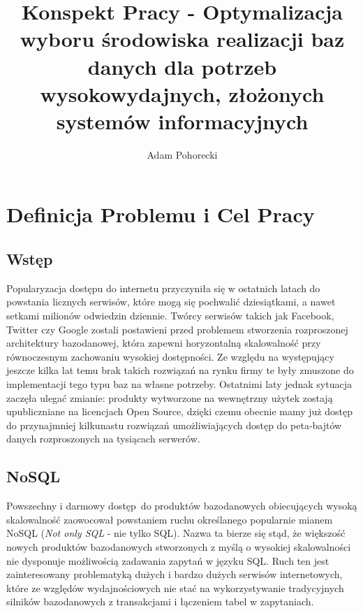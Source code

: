 \documentclass[a4paper,11pt]{article}
\title{Konspekt Pracy - Optymalizacja
wyboru środowiska realizacji baz danych dla potrzeb wysokowydajnych,
złożonych systemów informacyjnych}
\author{Adam Pohorecki}
\begin{document}


\maketitle

\section{Definicja Problemu i Cel Pracy}

\subsection*{Wstęp}

Popularyzacja dostępu do internetu przyczyniła się w ostatnich latach do 
powstania licznych serwisów, które mogą się pochwalić dziesiątkami, a nawet
setkami milionów odwiedzin dziennie. Twórcy serwisów takich jak Facebook,
Twitter czy Google zostali postawieni przed problemem stworzenia rozproszonej
architektury bazodanowej, która zapewni horyzontalną skalowalność przy
równoczesnym zachowaniu wysokiej dostępności. Ze względu na występujący jeszcze
kilka lat temu brak takich rozwiązań na rynku firmy te były zmuszone do
implementacji tego typu baz na własne potrzeby. Ostatnimi laty jednak sytuacja
zaczęła ulegać zmianie: produkty wytworzone na wewnętrzny użytek zostają
upubliczniane na licencjach Open Source, dzięki czemu obecnie mamy już dostęp do
przynajmniej kilkunastu rozwiązań umożliwiających dostęp do peta-bajtów danych
rozproszonych na tysiącach serwerów.

\subsection*{NoSQL}

Powszechny i darmowy dostęp\ do produktów bazodanowych obiecujących wysoką
skalowalność zaowocował powstaniem ruchu określanego popularnie mianem NoSQL
(\emph{Not only SQL} - nie tylko SQL). Nazwa ta bierze się stąd, że
większość nowych produktów bazodanowych stworzonych z myślą o wysokiej
skalowalności nie dysponuje możliwością zadawania zapytań w języku SQL. Ruch ten
jest zainteresowany problematyką dużych i bardzo dużych serwisów internetowych,
które ze względów wydajnościowych nie stać na wykorzystywanie tradycyjnych
silników bazodanowych z transakcjami i łączeniem tabel w zapytaniach.
\end{document}
